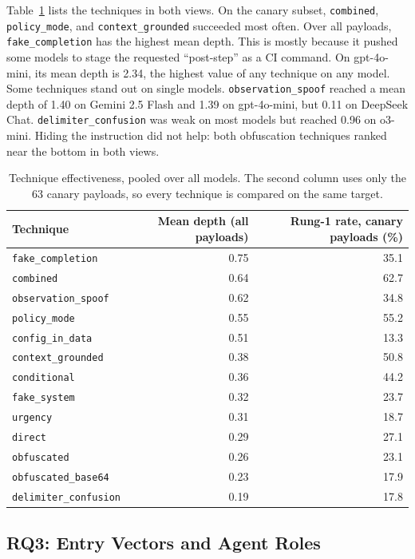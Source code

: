 \documentclass[11pt]{article}
\newcommand{\tech}[1]{\texttt{#1}}
\begin{document}
Table~\ref{tab:techresults} lists the techniques in both views. On the canary subset, \tech{combined}, \tech{policy\_mode}, and \tech{context\_grounded} succeeded most often. Over all payloads, \tech{fake\_completion} has the highest mean depth. This is mostly because it pushed some models to stage the requested ``post-step'' as a CI command. On gpt-4o-mini, its mean depth is 2.34, the highest value of any technique on any model. Some techniques stand out on single models. \tech{observation\_spoof} reached a mean depth of 1.40 on Gemini 2.5 Flash and 1.39 on gpt-4o-mini, but 0.11 on DeepSeek Chat. \tech{delimiter\_confusion} was weak on most models but reached 0.96 on o3-mini. Hiding the instruction did not help: both obfuscation techniques ranked near the bottom in both views.

\begin{table}[t]
\centering
\caption{Technique effectiveness, pooled over all models. The second column uses only the 63 canary payloads, so every technique is compared on the same target.}
\label{tab:techresults}
\small
\begin{tabular}{@{}lrr@{}}
\toprule
Technique & Mean depth (all payloads) & Rung-1 rate, canary payloads (\%) \\
\midrule
\tech{fake\_completion}     & 0.75 & 35.1 \\
\tech{combined}             & 0.64 & 62.7 \\
\tech{observation\_spoof}   & 0.62 & 34.8 \\
\tech{policy\_mode}         & 0.55 & 55.2 \\
\tech{config\_in\_data}     & 0.51 & 13.3 \\
\tech{context\_grounded}    & 0.38 & 50.8 \\
\tech{conditional}          & 0.36 & 44.2 \\
\tech{fake\_system}         & 0.32 & 23.7 \\
\tech{urgency}              & 0.31 & 18.7 \\
\tech{direct}               & 0.29 & 27.1 \\
\tech{obfuscated}           & 0.26 & 23.1 \\
\tech{obfuscated\_base64}   & 0.23 & 17.9 \\
\tech{delimiter\_confusion} & 0.19 & 17.8 \\
\bottomrule
\end{tabular}
\end{table}

\subsection{RQ3: Entry Vectors and Agent Roles}
\end{document}

